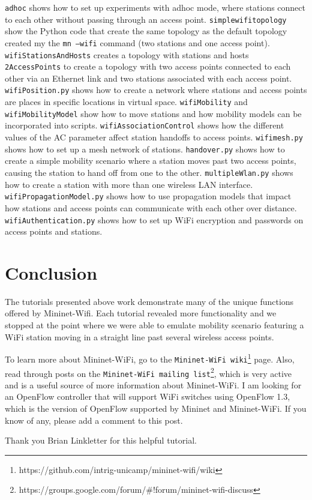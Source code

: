 \texttt{adhoc} shows how to set up experiments with  adhoc mode, where stations connect to each other without passing through an access point.
\texttt{simplewifitopology} show the Python code that create the same topology as the default topology created my the \texttt{mn --wifi} command (two stations and one access point).
\texttt{wifiStationsAndHosts} creates a topology with stations and hosts
\texttt{2AccessPoints} to create a topology with two access points connected to each other via an Ethernet link and two stations associated with each access point.
\texttt{wifiPosition.py} shows how to create a network where stations and access points are places in specific locations in virtual space.
\texttt{wifiMobility} and \texttt{wifiMobilityModel} show how to move stations and how mobility models can be incorporated into scripts.
\texttt{wifiAssociationControl} shows how the different values of the AC parameter affect station handoffs to access points.
\texttt{wifimesh.py} shows how to set up a mesh network of stations.
\texttt{handover.py} shows how to create a simple mobility scenario where a station moves past two access points, causing the station to hand off from one to the other. 
\texttt{multipleWlan.py} shows how to create a station with more than one wireless LAN interface.
\texttt{wifiPropagationModel.py} shows how to use propagation models that impact how stations and access points can communicate with each other over distance.
\texttt{wifiAuthentication.py} shows how to set up WiFi encryption and passwords on access points and stations.

\section{Conclusion}

The tutorials presented above work demonstrate many of the unique functions offered by Mininet-Wifi. Each tutorial revealed more functionality and we stopped at the point where we were able to emulate mobility scenario featuring a WiFi station moving in a straight line past several wireless access points. 

To learn more about Mininet-WiFi, go to the \texttt{Mininet-WiFi wiki}\footnote{https://github.com/intrig-unicamp/mininet-wifi/wiki} page. Also, read through posts on the \texttt{Mininet-WiFi mailing list}\footnote{https://groups.google.com/forum/\#!forum/mininet-wifi-discuss}, which is very active and is a useful source of more information about Mininet-WiFi. I am looking for an OpenFlow controller that will support WiFi switches using OpenFlow 1.3, which is the version of OpenFlow supported by Mininet and Mininet-WiFi. If you know of any, please add a comment to this post.

\begin{remark}
Thank you Brian Linkletter for this helpful tutorial.
\end{remark}